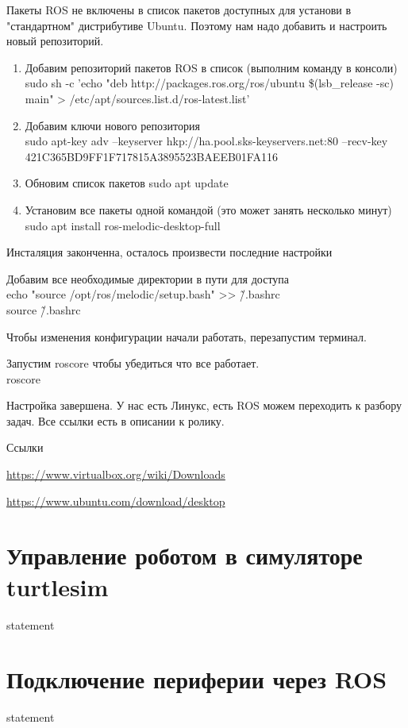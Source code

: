 Пакеты ROS не включены в список пакетов доступных для установи в "стандартном" дистрибутиве Ubuntu. Поэтому нам надо добавить и настроить новый репозиторий.
\begin{enumerate}
    \item Добавим репозиторий пакетов ROS в список (выполним команду в консоли)\\
    sudo sh -c 'echo "deb http://packages.ros.org/ros/ubuntu \$(lsb\_release -sc) main" > /etc/apt/sources.list.d/ros-latest.list'
    \item Добавим ключи нового репозитория\\
    sudo apt-key adv --keyserver hkp://ha.pool.sks-keyservers.net:80 --recv-key 421C365BD9FF1F717815A3895523BAEEB01FA116
    \item Обновим список пакетов
    sudo apt update
    \item Установим все пакеты одной командой (это может занять несколько минут)\\
    sudo apt install ros-melodic-desktop-full
\end{enumerate}

Инсталяция законченна, осталось произвести последние настройки

Добавим все необходимые директории в пути для доступа\\
echo "source /opt/ros/melodic/setup.bash" >> \~/.bashrc\\
source \~/.bashrc

Чтобы изменения конфигурации начали работать, перезапустим терминал.

Запустим roscore чтобы убедиться что все работает.\\
roscore

Настройка завершена. У нас есть Линукс, есть ROS можем переходить к разбору задач.
Все ссылки есть в описании к ролику.

Ссылки

\url{https://www.virtualbox.org/wiki/Downloads}

\url{https://www.ubuntu.com/download/desktop}

\section{Управление роботом в симуляторе turtlesim}

{statement}

\section{Подключение периферии через ROS}

{statement}